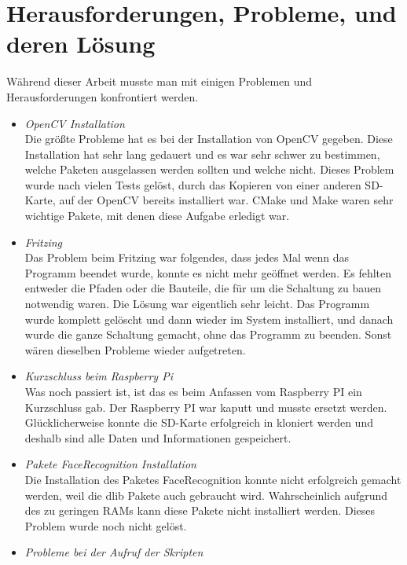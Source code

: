 	\section{Herausforderungen, Probleme, und deren Lösung}
	W{\"a}hrend dieser Arbeit musste man mit einigen Problemen und Herausforderungen konfrontiert werden.
	\begin{itemize}
		\item \textit{OpenCV Installation}\\
		
		Die gr{\"o}ßte Probleme hat es bei der Installation von OpenCV gegeben. Diese Installation hat sehr lang gedauert und es war sehr schwer zu bestimmen, welche Paketen ausgelassen werden sollten und welche nicht. Dieses Problem wurde nach vielen Tests gel{\"o}st, durch das Kopieren von einer anderen SD-Karte, auf der OpenCV bereits installiert war. CMake und Make waren sehr wichtige Pakete, mit denen diese Aufgabe erledigt war.
		\item \textit{Fritzing} \\
		
		Das Problem beim Fritzing war folgendes, dass jedes Mal wenn das Programm beendet wurde, konnte es nicht mehr ge{\"o}ffnet werden. Es fehlten entweder die Pfaden oder die Bauteile, die f{\"u}r um die Schaltung zu bauen notwendig waren. Die L{\"o}sung war eigentlich sehr leicht. Das Programm wurde komplett gel{\"o}scht und dann wieder im System installiert, und danach wurde die ganze Schaltung gemacht, ohne das Programm zu beenden. Sonst wären dieselben Probleme wieder aufgetreten.
		\item \textit{Kurzschluss beim Raspberry Pi}\\
		
		Was noch passiert ist, ist das es beim Anfassen vom Raspberry PI ein Kurzschluss gab. Der Raspberry PI war kaputt und musste ersetzt werden. Glücklicherweise konnte die SD-Karte erfolgreich in kloniert werden und deshalb sind alle Daten und Informationen gespeichert.
		
		\item \textit{Pakete FaceRecognition Installation} \\
		
		Die Installation des Paketes FaceRecognition konnte nicht erfolgreich gemacht werden, weil die dlib Pakete auch gebraucht wird. Wahrscheinlich aufgrund des zu geringen RAMs kann diese Pakete nicht installiert werden. Dieses Problem wurde noch nicht gel{\"o}st.
		
		\item \textit{Probleme bei der Aufruf der Skripten } \\
		

\end{itemize}
